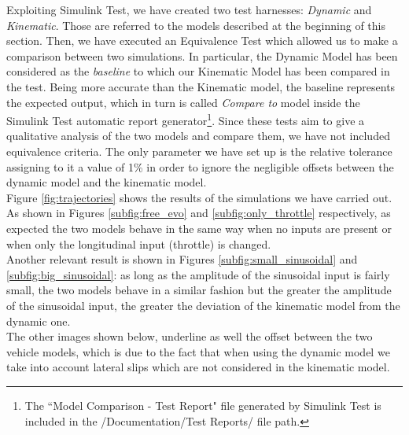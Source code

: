 Exploiting Simulink Test, we have created two test harnesses: \textit{Dynamic} and \textit{Kinematic}. Those are referred to the models described at the beginning of this section. Then, we have executed an Equivalence Test which allowed us to make a comparison between two simulations. In particular, the Dynamic Model has been considered as the \textit{baseline} to which our Kinematic Model has been compared in the test. Being more accurate than the Kinematic model, the baseline represents the expected output, which in turn is called \textit{Compare to} model inside the Simulink Test automatic report generator\footnote{The ``Model Comparison - Test Report" file generated by Simulink Test is included in the /Documentation/Test Reports/ file path.}. 
Since these tests aim to give a qualitative analysis of the two models and compare them, we have not included equivalence criteria.
The only parameter we have set up is the relative tolerance assigning to it a value of 1\% in order to ignore the negligible offsets between the dynamic model and the kinematic model.\\
Figure \ref{fig:trajectories} shows the results of the simulations we have carried out. 
As shown in Figures \ref{subfig:free_evo} and \ref{subfig:only_throttle} respectively, as expected the two models behave in the same way when no inputs are present or when only the longitudinal input (throttle) is changed. \\ Another relevant result is shown in Figures \ref{subfig:small_sinusoidal} and \ref{subfig:big_sinusoidal}: as long as the amplitude of the sinusoidal input is fairly small, the two models behave in a similar fashion but the greater the amplitude of the sinusoidal input, the greater the deviation of the kinematic model from the dynamic one.\\
The other images shown below, underline as well the offset between the two vehicle models, which is due to the fact that when using the dynamic model we take into account lateral slips which are not considered in the kinematic model.


